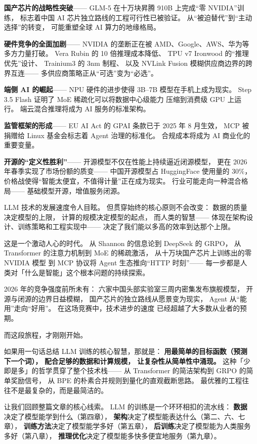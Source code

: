 \textbf{国产芯片的战略性突破}——
GLM-5 在十万块昇腾 910B 上完成``零 NVIDIA''训练，
标志着中国 AI 芯片独立路线的工程可行性已被验证。
从``被迫替代''到``主动选择''的转变，
可能重塑全球 AI 算力的地缘格局。

\textbf{硬件竞争的全面加剧}——
NVIDIA 的垄断正在被 AMD、Google、AWS、华为等多方力量打破。
Vera Rubin 的 10 倍推理成本降低、
TPU v7 Ironwood 的``推理优先''设计、
Trainium3 的 3nm 制程、
以及 NVLink Fusion 模糊供应商边界的跨界互连——
多供应商策略正从``可选''变为``必选''。

\textbf{端侧 AI 的崛起}——
NPU 硬件的进步使得 3B--7B 模型在手机上成为现实。
Step 3.5 Flash 证明了 MoE 稀疏化可以将数据中心级能力
压缩到消费级 GPU 上运行。
端云混合推理将成为 AI 服务的标准架构。

\textbf{监管框架的形成}——
EU AI Act 的 GPAI 条款已于 2025 年 8 月生效，
MCP 被捐赠给 Linux 基金会标志着 Agent 治理的标准化。
合规成本将成为 AI 商业化的重要变量。

\textbf{开源的``定义性胜利''}——
开源模型不仅在性能上持续逼近闭源模型，
更在 2026 年春季实现了市场份额的质变——
中国开源模型占 HuggingFace 使用量的 30\%，
价格战使得``智能太便宜，不值得计量''正在成为现实。
行业可能走向一种混合格局——
基础模型开源，增值服务闭源。

LLM 技术的发展速度令人目眩。
但贯穿始终的核心原则不会改变：
数据的质量决定模型的上限，
计算的规模决定模型的起点，
而人类的智慧——
体现在架构设计、训练策略和工程实现中——
决定了我们能以多高的效率到达那个上限。

这是一个激动人心的时代。
从 Shannon 的信息论到 DeepSeek 的 GRPO，
从 Transformer 的注意力机制到 MoE 的稀疏激活，
从十万块国产芯片上训练出的零 NVIDIA 模型
到 MCP 协议将 Agent 生态推向``HTTP 时刻''——
每一步都是人类对「什么是智能」这个根本问题的持续探索。

2026 年的竞争强度前所未有：
六家中国头部实验室三周内密集发布旗舰模型，
开源与闭源的边界日益模糊，
国产芯片的独立路线从愿景变为现实，
Agent 从``能用''走向``好用''。
在这场竞赛中，技术进步的速度
已经超越了大多数从业者的预期。

而这段旅程，才刚刚开始。

如果用一句话总结 LLM 训练的核心智慧，那就是：
\textbf{用最简单的目标函数（预测下一个词），
配合足够的数据和计算规模，
让复杂性从简单性中涌现。}
这种「少即是多」的哲学贯穿了整个技术栈——
从 Transformer 的简洁架构到 GRPO 的简单奖励信号，
从 BPE 的朴素合并规则到量化的直观截断思路。
最优雅的工程往往不是最复杂的，而是最简洁的。

让我们回顾整篇文章的核心线索。
LLM 的训练是一个环环相扣的流水线：
\textbf{数据}决定了模型能学到什么（第四章），
\textbf{架构}决定了模型能表达什么（第二、六、七章），
\textbf{训练方法}决定了模型能学多好（第五章），
\textbf{后训练}决定了模型能为人类服务多好（第八章），
\textbf{推理优化}决定了模型能多快多便宜地服务（第九章）。

